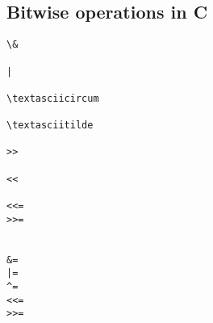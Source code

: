 
\subsection{Bitwise operations in C}

\begin{verbatim}
\&

|

\textasciicircum

\textasciitilde

>>

<<

<<=
>>=


&=
|=
^=
<<=
>>=

\end{verbatim}

